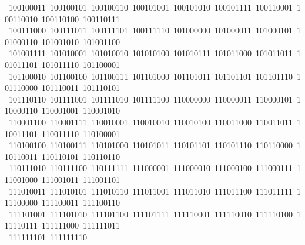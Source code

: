 \begin{flushleft}
\ 100100011\ 100100101\ 100100110\ 100101001\ 100101010\ 100101111\ 100110001\ 100110010\ 100110100\ 100110111\\
\ 100111000\ 100111011\ 100111101\ 100111110\ 101000000\ 101000011\ 101000101\ 101000110\ 101001010\ 101001100\\
\ 101001111\ 101010001\ 101010010\ 101010100\ 101010111\ 101011000\ 101011011\ 101011101\ 101011110\ 101100001\\
\ 101100010\ 101100100\ 101100111\ 101101000\ 101101011\ 101101101\ 101101110\ 101110000\ 101110011\ 101110101\\
\ 101110110\ 101111001\ 101111010\ 101111100\ 110000000\ 110000011\ 110000101\ 110000110\ 110001001\ 110001010\\
\ 110001100\ 110001111\ 110010001\ 110010010\ 110010100\ 110011000\ 110011011\ 110011101\ 110011110\ 110100001\\
\ 110100100\ 110100111\ 110101000\ 110101011\ 110101101\ 110101110\ 110110000\ 110110011\ 110110101\ 110110110\\
\ 110111010\ 110111100\ 110111111\ 111000001\ 111000010\ 111000100\ 111000111\ 111001000\ 111001011\ 111001101\\
\ 111010011\ 111010101\ 111010110\ 111011001\ 111011010\ 111011100\ 111011111\ 111100000\ 111100011\ 111100110\\
\ 111101001\ 111101010\ 111101100\ 111101111\ 111110001\ 111110010\ 111110100\ 111110111\ 111111000\ 111111011\\
\ 111111101\ 111111110\\
\end{flushleft}
